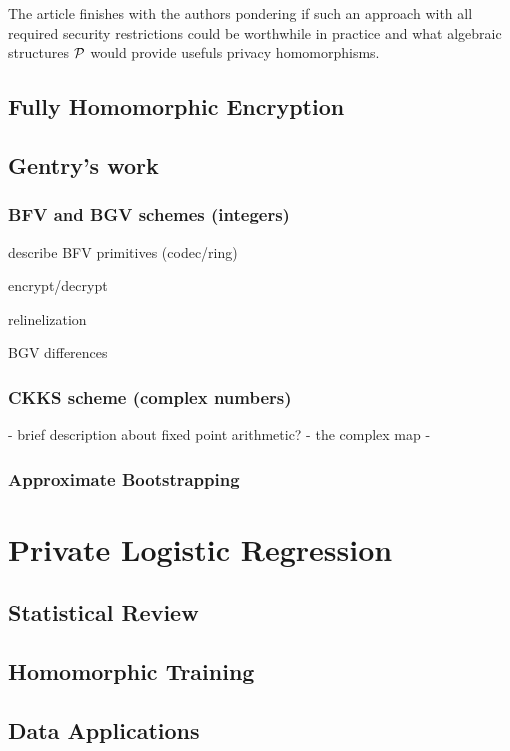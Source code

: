 The article finishes with the authors pondering if such an approach with all required security restrictions could be worthwhile in practice and what algebraic structures $\mathcal P$ would provide usefuls privacy homomorphisms.

\section{Fully Homomorphic Encryption}
\section{Gentry's work}


\subsection{BFV and BGV schemes (integers)}

\begin{alineas}
\item describe BFV primitives (codec/ring)
\item encrypt/decrypt
\item relinelization
\item BGV differences
\end{alineas}

\subsection{CKKS scheme (complex numbers)}

- brief description about fixed point arithmetic?
- the complex map 
- 
\subsection{Approximate Bootstrapping}

\chapter{Private Logistic Regression}
\section{Statistical Review}
\section{Homomorphic Training}
\section{Data Applications}


\label{ch:algebra}

